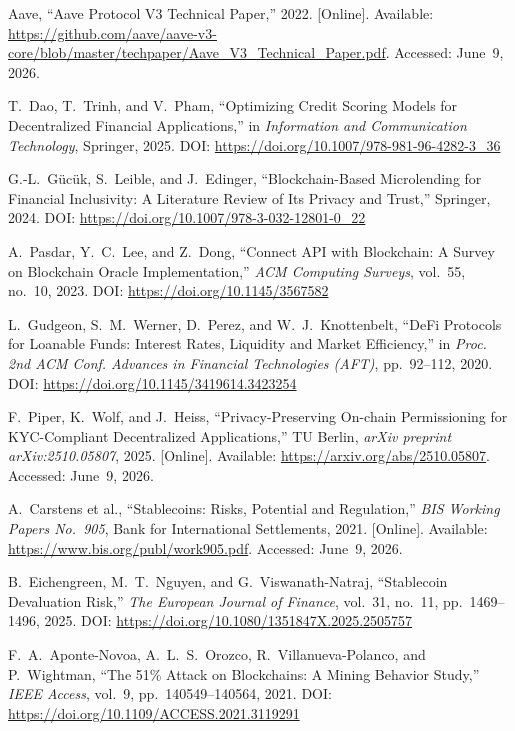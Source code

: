 \documentclass[12pt, a4paper]{report}
\begin{document}
{\begin{enumerate}[label={[\arabic*]}]
\item Aave, ``Aave Protocol V3 Technical Paper,'' 2022. [Online]. Available: \url{https://github.com/aave/aave-v3-core/blob/master/techpaper/Aave_V3_Technical_Paper.pdf}. Accessed: June~9, 2026.

\item T.~Dao, T.~Trinh, and V.~Pham, ``Optimizing Credit Scoring Models for Decentralized Financial Applications,'' in \textit{Information and Communication Technology}, Springer, 2025. DOI: \url{https://doi.org/10.1007/978-981-96-4282-3_36}

\item G.-L.~G\"{u}c\"{u}k, S.~Leible, and J.~Edinger, ``Blockchain-Based Microlending for Financial Inclusivity: A Literature Review of Its Privacy and Trust,'' Springer, 2024. DOI: \url{https://doi.org/10.1007/978-3-032-12801-0_22}

\item A.~Pasdar, Y.~C.~Lee, and Z.~Dong, ``Connect API with Blockchain: A Survey on Blockchain Oracle Implementation,'' \textit{ACM Computing Surveys}, vol.~55, no.~10, 2023. DOI: \url{https://doi.org/10.1145/3567582}

\item L.~Gudgeon, S.~M.~Werner, D.~Perez, and W.~J.~Knottenbelt, ``DeFi Protocols for Loanable Funds: Interest Rates, Liquidity and Market Efficiency,'' in \textit{Proc. 2nd ACM Conf. Advances in Financial Technologies (AFT)}, pp.~92--112, 2020. DOI: \url{https://doi.org/10.1145/3419614.3423254}

\item F.~Piper, K.~Wolf, and J.~Heiss, ``Privacy-Preserving On-chain Permissioning for KYC-Compliant Decentralized Applications,'' TU Berlin, \textit{arXiv preprint arXiv:2510.05807}, 2025. [Online]. Available: \url{https://arxiv.org/abs/2510.05807}. Accessed: June~9, 2026.

\item A.~Carstens et al., ``Stablecoins: Risks, Potential and Regulation,'' \textit{BIS Working Papers No.~905}, Bank for International Settlements, 2021. [Online]. Available: \url{https://www.bis.org/publ/work905.pdf}. Accessed: June~9, 2026.

\item B.~Eichengreen, M.~T.~Nguyen, and G.~Viswanath-Natraj, ``Stablecoin Devaluation Risk,'' \textit{The European Journal of Finance}, vol.~31, no.~11, pp.~1469--1496, 2025. DOI: \url{https://doi.org/10.1080/1351847X.2025.2505757}

\item F.~A.~Aponte-Novoa, A.~L.~S.~Orozco, R.~Villanueva-Polanco, and P.~Wightman, ``The 51\% Attack on Blockchains: A Mining Behavior Study,'' \textit{IEEE Access}, vol.~9, pp.~140549--140564, 2021. DOI: \url{https://doi.org/10.1109/ACCESS.2021.3119291}


\end{enumerate}}
\end{document}
